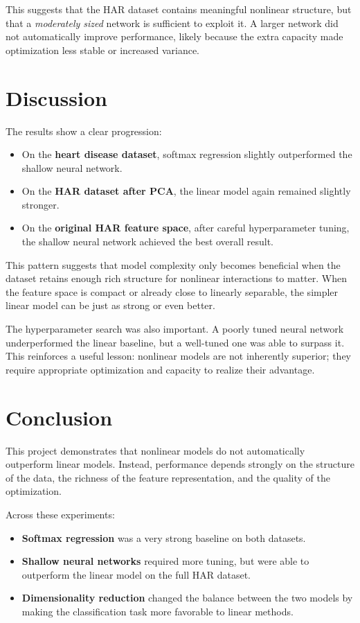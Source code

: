 \documentclass[11pt]{article}
\begin{document}
This suggests that the HAR dataset contains meaningful nonlinear structure, but that a \emph{moderately sized} network is sufficient to exploit it. A larger network did not automatically improve performance, likely because the extra capacity made optimization less stable or increased variance.

\section*{Discussion}

The results show a clear progression:

\begin{itemize}
    \item On the \textbf{heart disease dataset}, softmax regression slightly outperformed the shallow neural network.
    \item On the \textbf{HAR dataset after PCA}, the linear model again remained slightly stronger.
    \item On the \textbf{original HAR feature space}, after careful hyperparameter tuning, the shallow neural network achieved the best overall result.
\end{itemize}

This pattern suggests that model complexity only becomes beneficial when the dataset retains enough rich structure for nonlinear interactions to matter. When the feature space is compact or already close to linearly separable, the simpler linear model can be just as strong or even better.

The hyperparameter search was also important. A poorly tuned neural network underperformed the linear baseline, but a well-tuned one was able to surpass it. This reinforces a useful lesson: nonlinear models are not inherently superior; they require appropriate optimization and capacity to realize their advantage.

\section*{Conclusion}

This project demonstrates that nonlinear models do not automatically outperform linear models. Instead, performance depends strongly on the structure of the data, the richness of the feature representation, and the quality of the optimization.

Across these experiments:

\begin{itemize}
    \item \textbf{Softmax regression} was a very strong baseline on both datasets.
    \item \textbf{Shallow neural networks} required more tuning, but were able to outperform the linear model on the full HAR dataset.
    \item \textbf{Dimensionality reduction} changed the balance between the two models by making the classification task more favorable to linear methods.
\end{itemize}
\end{document}
